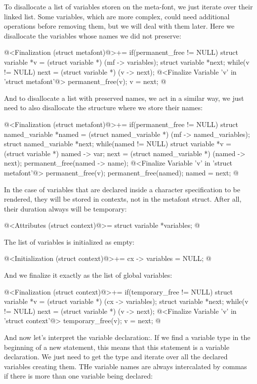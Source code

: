 To disallocate a list of variables storen on the meta-font, we just
iterate over their linked list. Some variables, which are more
complex, could need additional operations before removing them, but we
will deal with them later. Here we disallocate the variables whose
names we did not preserve:

\iniciocodigo
@<Finalization (struct metafont)@>+=
if(permanent_free != NULL){
  struct variable *v = (struct variable *) (mf -> variables);
  struct variable *next;
  while(v != NULL){
    next = (struct variable *) (v -> next);
    @<Finalize Variable 'v' in 'struct metafont'@>
    permanent_free(v);
    v = next;
  }
}
@
\fimcodigo

And to disallocate a list with preserved names, we act in a similar
way, we just need to also disallocate the structure where we store
their names:

\iniciocodigo
@<Finalization (struct metafont)@>+=
if(permanent_free != NULL){
  struct named_variable *named = (struct named_variable *)
                                   (mf -> named_variables);
  struct named_variable *next;
  while(named != NULL){
    struct variable *v = (struct variable *) named -> var;
    next = (struct named_variable *) (named -> next);
    permanent_free(named -> name);
    @<Finalize Variable 'v' in 'struct metafont'@>
    permanent_free(v);
    permanent_free(named);
    named = next;
  }
}
@
\fimcodigo

In the case of variables that are declared inside a character
specification to be rendered, they will be stored in contexts, not in
the metafont struct. After all, their duration always will be
temporary:

\iniciocodigo
@<Attributes (struct context)@>=
  struct variable *variables;
@
\fimcodigo

The list of variables is initialized as empty:

\iniciocodigo
@<Initialization (struct context)@>+=
cx -> variables = NULL;
@
\fimcodigo

And we finalize it exactly as the list of global variables:

\iniciocodigo
@<Finalization (struct context)@>+=
if(temporary_free != NULL){
  struct variable *v = (struct variable *) (cx -> variables);
  struct variable *next;
  while(v != NULL){
    next = (struct variable *) (v -> next);
    @<Finalize Variable 'v' in 'struct context'@>
    temporary_free(v);
    v = next;
  }
}
@
\fimcodigo

And now let's interpret the variable declaration:. If we find a
variable type in the beginning of a new statement, this means that
this statement is a variable declaration. We just need to get the type
and iterate over all the declared variables creating them. THe
variable names are always intercalated by commas if there is more than
one variable being declared:

